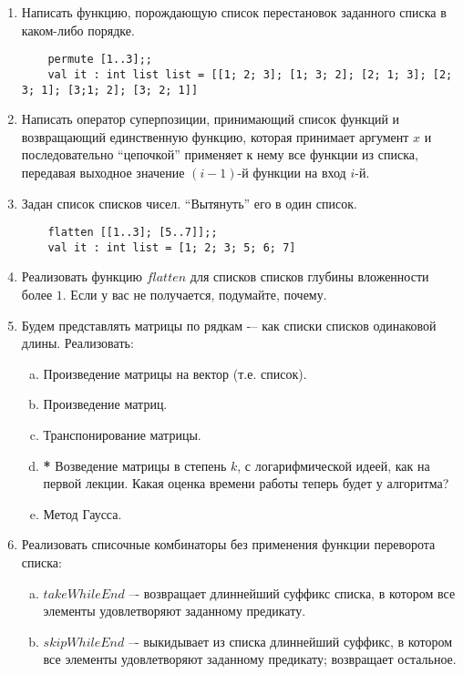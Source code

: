 \documentclass[a4paper,11pt]{article}
\begin{document}
\begin{enumerate}[{2-}1]
\item Написать функцию, порождающую список перестановок заданного списка в 
  каком-либо порядке.
  \begin{lstlisting}
    permute [1..3];;
    val it : int list list = [[1; 2; 3]; [1; 3; 2]; [2; 1; 3]; [2; 3; 1]; [3;1; 2]; [3; 2; 1]]
  \end{lstlisting}

\item Написать оператор суперпозиции, принимающий список функций и возвращающий
  единственную функцию, которая принимает аргумент $x$ и последовательно
  ``цепочкой'' применяет к нему все функции из списка, передавая выходное 
  значение $(i-1)$-й функции на вход $i$-й.
  
\item Задан список списков чисел. ``Вытянуть'' его в один список.
  \begin{lstlisting}
    flatten [[1..3]; [5..7]];;
    val it : int list = [1; 2; 3; 5; 6; 7]
  \end{lstlisting}
  
\item Реализовать функцию $flatten$ для списков списков глубины вложенности
  более $1$. Если у вас не получается, подумайте, почему.

\item Будем представлять матрицы по рядкам -– как списки списков одинаковой 
  длины. Реализовать:
  \begin{enumerate}[(a)]
  \item Произведение матрицы на вектор (т.е. список).
  \item Произведение матриц.
  \item Транспонирование матрицы.
  \item \textbf{*} Возведение матрицы в степень $k$, с логарифмической идеей,
    как на первой лекции. Какая оценка времени работы теперь будет у алгоритма?
  \item  Метод Гаусса.
  \end{enumerate}
  
\item Реализовать списочные комбинаторы без применения функции переворота 
  списка:
  \begin{enumerate}[(a)]
  \item $takeWhileEnd$ –- возвращает длиннейший суффикс списка, в котором все
    элементы удовлетворяют заданному предикату.

  \item $skipWhileEnd$ –- выкидывает из списка длиннейший суффикс, в котором 
    все элементы удовлетворяют заданному предикату; возвращает остальное.
  \end{enumerate}


\end{enumerate}
\end{document}
